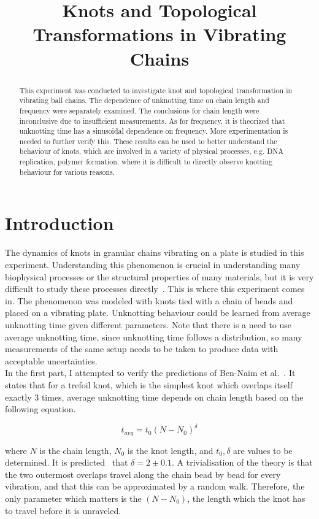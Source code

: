 \documentclass[12pt]{IEEEtran}
\title{Knots and Topological Transformations in Vibrating Chains}
\begin{document}
\maketitle

\begin{abstract}
    This experiment was conducted to investigate knot and topological transformation in vibrating ball chains. The dependence of unknotting time on chain length and frequency were separately examined. The conclusions for chain length were inconclusive due to insufficient measurements. As for frequency, it is theorized that unknotting time has a sinusoidal dependence on frequency. More experimentation is needed to further verify this. These results can be used to better understand the behaviour of knots, which are involved in a variety of physical processes, e.g. DNA replication, polymer formation, where it is difficult to directly observe knotting behaviour for various reasons.
\end{abstract}

\section{Introduction}

The dynamics of knots in granular chains vibrating on a plate is studied in this experiment. Understanding this phenomenon is crucial in understanding many biophysical processes or the structural properties of many materials, but it is very difficult to study these processes directly~\cite{manual}. This is where this experiment comes in. The phenomenon was modeled with knots tied with a chain of beads and placed on a vibrating plate. Unknotting behaviour could be learned from average unknotting time given different parameters. Note that there is a need to use average unknotting time, since unknotting time follows a distribution, so many measurements of the same setup needs to be taken to produce data with acceptable uncertainties. \\
In the first part, I attempted to verify the predictions of Ben-Naim et al.~\cite{bennaim}. It states that for a trefoil knot, which is the simplest knot which overlaps itself exactly 3 times, average unknotting time depends on chain length based on the following equation.

\begin{equation}\label{powerlaw}
    t_{avg} = t_0(N - N_0)^\delta
\end{equation}

where $N$ is the chain length, $N_0$ is the knot length, and $t_0, \delta$ are values to be determined. It is predicted~\cite{bennaim} that $\delta = 2 \pm 0.1$. A trivialisation of the theory is that the two outermost overlaps travel along the chain bead by bead for every vibration, and that this can be approximated by a random walk. Therefore, the only parameter which matters is the $(N - N_0)$, the length which the knot has to travel before it is unraveled. \\
\end{document}
